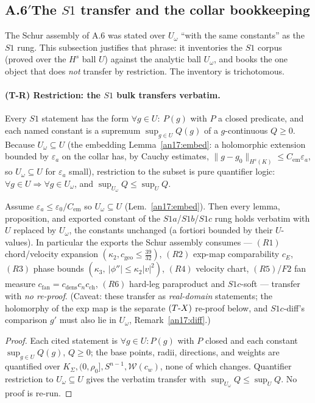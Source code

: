 \subsection{A.6$'$\quad The $S1$ transfer and the collar bookkeeping}
\label{an17:sec-S1transfer}

The Schur assembly of A.6 was stated over $U_\omega$ ``with the same constants''
as the $S1$ rung. This subsection justifies that phrase: it inventories the
$S1$ corpus (proved over the $H^s$ ball $U$) against the analytic ball
$U_\omega$, and books the one object that does \emph{not} transfer by restriction.
The inventory is trichotomous.

\paragraph{(T-R) Restriction: the $S1$ bulk transfers verbatim.} Every $S1$
statement has the form $\forall g\in U:\ P(g)$ with $P$ a closed predicate, and
each named constant is a supremum $\sup_{g\in U}Q(g)$ of a $g$-continuous
$Q\ge0$. Because $U_\omega\subseteq U$ (the embedding
Lemma~\ref{an17:embed}: a holomorphic extension bounded by $\varepsilon_a$
on the collar has, by Cauchy estimates, $\|g-g_0\|_{H^s(K)}\le C_{\mathrm{em}}
\varepsilon_a$, so $U_\omega\subseteq U$ for $\varepsilon_a$ small), restriction
to the subset is pure quantifier logic: $\forall g\in U\Rightarrow\forall g\in
U_\omega$, and $\sup_{U_\omega}Q\le\sup_U Q$.

\begin{proposition}\label{an17:S1-restrict}
Assume $\varepsilon_a\le\varepsilon_0/C_{\mathrm{em}}$ so $U_\omega\subseteq U$
\textup{(Lem.~\ref{an17:embed})}. Then every lemma, proposition, and exported
constant of the $S1a$/$S1b$/$S1c$ rung holds verbatim with $U$ replaced by
$U_\omega$, the constants unchanged \textup{(}a fortiori bounded by their
$U$-values\textup{)}. In particular the exports the Schur assembly consumes ---
$(R1)$ chord/velocity expansion $(\kappa_2,c_{\mathrm{geo}}\le\tfrac{39}{32})$,
$(R2)$ exp-map comparability $c_E$, $(R3)$ phase bounds
$(\kappa_3,\ |\phi''|\le\kappa_2|v|^2)$, $(R4)$ velocity chart, $(R5)$/$F2$ fan
measure $c_{\mathrm{fan}}=c_{\mathrm{dens}}c_nc_{\mathrm{ch}}$, $(R6)$ hard-leg
paraproduct and $S1c$-soft --- transfer with \emph{no re-proof}. \textup{(}Caveat:
these transfer as \emph{real-domain} statements; the holomorphy of the exp map is
the separate $(T\text-X)$ re-proof below, and $S1c$-diff's comparison $g'$ must
also lie in $U_\omega$, Remark~\ref{an17:diff}.\textup{)}
\end{proposition}
\begin{proof}
Each cited statement is $\forall g\in U:P(g)$ with $P$ closed and each constant
$\sup_{g\in U}Q(g)$, $Q\ge0$; the base points, radii, directions, and weights are
quantified over $K_\Sigma,(0,\rho_0],S^{n-1},\mathcal W(c_w)$, none of which
changes. Quantifier restriction to $U_\omega\subseteq U$ gives the verbatim
transfer with $\sup_{U_\omega}Q\le\sup_U Q$. No proof is re-run.
\end{proof}

